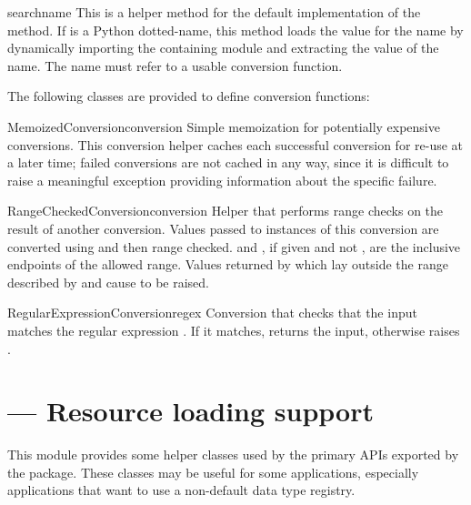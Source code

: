 \documentclass{howto}
\begin{document}
\begin{methoddesc}{search}{name}
  This is a helper method for the default implementation of the
   method.  If  is a Python dotted-name, this
  method loads the value for the name by dynamically importing the
  containing module and extracting the value of the name.  The name
  must refer to a usable conversion function.
\end{methoddesc}


The following classes are provided to define conversion functions:

\begin{classdesc}{MemoizedConversion}{conversion}
  Simple memoization for potentially expensive conversions.  This
  conversion helper caches each successful conversion for re-use at a
  later time; failed conversions are not cached in any way, since it
  is difficult to raise a meaningful exception providing information
  about the specific failure.
\end{classdesc}

\begin{classdesc}{RangeCheckedConversion}{conversion}
  Helper that performs range checks on the result of another
  conversion.  Values passed to instances of this conversion are
  converted using  and then range checked.  
  and , if given and not , are the inclusive
  endpoints of the allowed range.  Values returned by 
  which lay outside the range described by  and 
  cause  to be raised.
\end{classdesc}

\begin{classdesc}{RegularExpressionConversion}{regex}
  Conversion that checks that the input matches the regular expression
  .  If it matches, returns the input, otherwise raises
  .
\end{classdesc}


\section{ --- Resource loading support}


This module provides some helper classes used by the primary APIs
exported by the  package.  These classes may be useful
for some applications, especially applications that want to use a
non-default data type registry.
\end{document}
